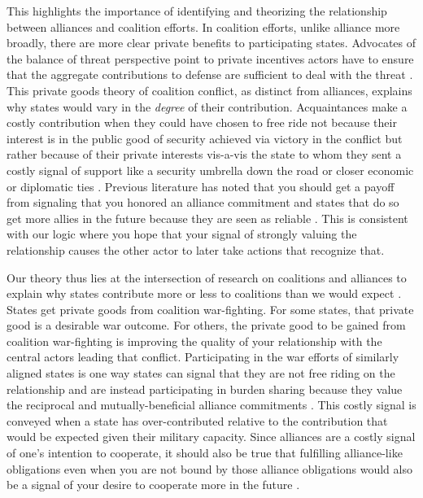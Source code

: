 \documentclass[12pt,letterpaper]{article}
\begin{document}
	This highlights the importance of identifying and theorizing the relationship between alliances and coalition efforts. In coalition efforts, unlike alliance more broadly, there are more clear private benefits to participating states. Advocates of the balance of threat perspective point to private incentives actors have to ensure that the aggregate contributions to defense are sufficient to deal with the threat \citep{bennett_friendsneedburden_1997, baltrusaitis_coalitionpoliticsiraq_2010, davidson_neoclassicalrealistexplanation_2011}. This private goods theory of coalition conflict, as distinct from alliances, explains why states would vary in the \textit{degree} of their contribution. Acquaintances make a costly contribution when they could have chosen to free ride not because their interest is in the public good of security achieved via victory in the conflict but rather because of their private interests vis-a-vis the state to whom they sent a costly signal of support like a security umbrella down the road or closer economic or diplomatic ties \citep{long_defensepactsinternational_2003}. Previous literature has noted that you should get a payoff from signaling that you honored an alliance commitment and states that do so get more allies in the future because they are seen as reliable \citep[427-428]{gibler_costsrenegingreputation_2008}. This is consistent with our logic where you hope that your signal of strongly valuing the relationship causes the other actor to later take actions that recognize that.
	
	Our theory thus lies at the intersection of research on coalitions and alliances to explain why states contribute more or less to coalitions than we would expect \citep{saideman_ambivalentcoalitiondoing_2016}. States get private goods from coalition war-fighting. For some states, that private good is a desirable war outcome. For others, the private good to be gained from coalition war-fighting is improving the quality of your relationship with the central actors leading that conflict. Participating in the war efforts of similarly aligned states is one way states can signal that they are not free riding on the relationship and are instead participating in burden sharing because they value the reciprocal and mutually-beneficial alliance commitments \citep[225-227]{maskaliunaite_sharingburdenassessing_2014}. This costly signal is conveyed when a state has over-contributed relative to the contribution that would be expected given their military capacity. Since alliances are a costly signal of one's intention to cooperate, it should also be true that fulfilling alliance-like obligations even when you are not bound by those alliance obligations would also be a signal of your desire to cooperate more in the future \citep[704]{warren_geometrysecuritymodeling_2010}. 
\end{document}
